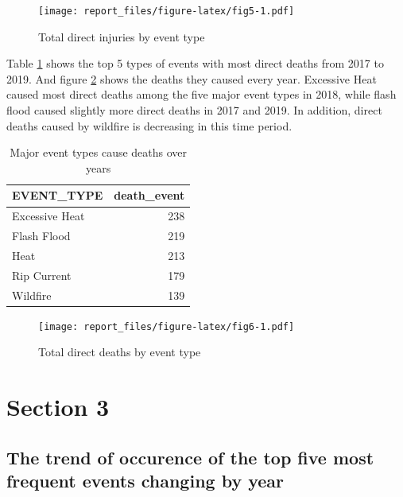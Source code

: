 \documentclass[
]{article}
\begin{document}
\begin{figure}
\centering
\texttt{[image: report\_files/figure-latex/fig5-1.pdf]}
\caption{\label{fig:fig5}Total direct injuries by event type}
\end{figure}

\clearpage

Table \ref{tab:tab2} shows the top 5 types of events with most direct deaths from 2017 to 2019. And figure \ref{fig:fig6} shows the deaths they caused every year. Excessive Heat caused most direct deaths among the five major event types in 2018, while flash flood caused slightly more direct deaths in 2017 and 2019. In addition, direct deaths caused by wildfire is decreasing in this time period.

\begin{table}[!h]

\caption{\label{tab:tab2}Major event types cause deaths over years}
\centering
\begin{tabular}[t]{lr}
\toprule
EVENT\_TYPE & death\_event\\
\midrule
\rowcolor{gray!6}  Excessive Heat & 238\\
Flash Flood & 219\\
\rowcolor{gray!6}  Heat & 213\\
Rip Current & 179\\
\rowcolor{gray!6}  Wildfire & 139\\
\bottomrule
\end{tabular}
\end{table}

\begin{figure}
\centering
\texttt{[image: report\_files/figure-latex/fig6-1.pdf]}
\caption{\label{fig:fig6}Total direct deaths by event type}
\end{figure}

\clearpage

\hypertarget{section-3}{%
\section{Section 3}\label{section-3}}

\hypertarget{the-trend-of-occurence-of-the-top-five-most-frequent-events-changing-by-year}{%
\subsection{The trend of occurence of the top five most frequent events changing by year}\label{the-trend-of-occurence-of-the-top-five-most-frequent-events-changing-by-year}}
\end{document}
